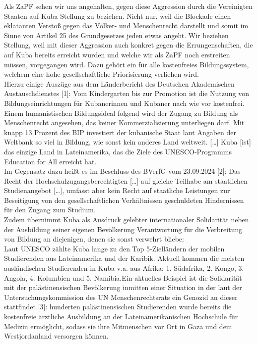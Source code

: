 \documentclass[DIV=calc]{scrartcl}
\let\oldgrqq=\grqq
\def\grqq{\oldgrqq\xspace}
\begin{document}
Als ZaPF sehen wir uns angehalten, gegen diese Aggression durch die Vereinigten Staaten auf Kuba Stellung zu beziehen. Nicht nur, weil die Blockade einen eklatanten Verstoß gegen das Völker- und Menschenrecht darstellt und somit im Sinne von Artikel 25 des Grundgesetzes jeden 
etwas angeht. Wir beziehen Stellung, weil mit dieser Aggression auch konkret gegen die Errungenschaften, die auf Kuba bereits erreicht wurden und welche wir als ZaPF noch erstreiten müssen, vorgegangen wird.
Dazu gehört ein für alle kostenfreies Bildungssystem, welchem eine hohe gesellschaftliche Priorisierung verliehen wird.\\

Hierzu einige Auszüge aus dem Länderbericht des Deutschen Akademischen Austauschdienstes [1]:
\glqq Vom Kindergarten bis zur Promotion ist die Nutzung von Bildungseinrichtungen für Kubanerinnen und Kubaner nach wie vor kostenfrei. Einem humanistischen Bildungsideal folgend wird der Zugang zu Bildung 
als Menschenrecht angesehen, das keiner Kommerzialisierung unterliegen darf. Mit knapp 13 Prozent des BIP investiert der kubanische Staat laut Angaben der Weltbank so viel in Bildung, wie sonst kein anderes Land weltweit. […] Kuba [ist] das einzige Land in Lateinamerika, das die Ziele des UNESCO-Programms 
\glqq Education for All\grqq erreicht hat.\grqq \\

Im Gegensatz dazu heißt es im Beschluss des BVerfG vom 23.09.2024 [2]:
\glqq Das Recht der Hochschulzugangsberechtigten […] auf gleiche Teilhabe am staatlichen Studienangebot […], umfasst aber kein Recht auf staatliche Leistungen zur Beseitigung von den gesellschaftlichen Verhältnissen geschuldeten Hindernissen für den Zugang zum Studium.\grqq \\

Zudem übernimmt Kuba als Ausdruck gelebter internationaler Solidarität neben der Ausbildung seiner eigenen Bevölkerung Verantwortung für die Verbreitung von Bildung an diejenigen, denen sie sonst verwehrt bliebe:\\

\glqq Laut UNESCO zählte Kuba lange zu den Top 5-Zielländern der mobilen Studierenden aus Lateinamerika und der Karibik. Aktuell kommen die meisten ausländischen Studierenden in Kuba v.a. aus Afrika: 1. Südafrika, 2. Kongo, 3. Angola, 4. Kolumbien und 5. Namibia.\grqq [1] Ein aktuelles Beispiel ist die Solidarität mit der palästinensischen Bevölkerung inmitten einer Situation in der laut der Untersuchungskommission des UN Menschenrechtsrats ein Genozid an dieser stattfindet [3]: hunderten palästinensischen Studierenden wurde bereits die kostenfreie ärztliche Ausbildung an der Lateinamerikanischen Hochschule 
für Medizin ermöglicht, sodass sie ihre Mitmenschen vor Ort in Gaza und dem Westjordanland versorgen können.\\
\end{document}
